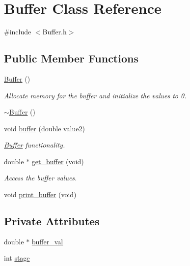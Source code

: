 \hypertarget{class_buffer}{}\section{Buffer Class Reference}
\label{class_buffer}


{\ttfamily \#include $<$Buffer.\+h$>$}

\subsection*{Public Member Functions}
\begin{DoxyCompactItemize}
\item 
\mbox{\hyperlink{class_buffer_ae7ef2cd201190fde551dcb902627112b}{Buffer}} ()
\begin{DoxyCompactList}\small\item\em Allocate memory for the buffer and initialize the values to 0. \end{DoxyCompactList}\item 
\mbox{\hyperlink{class_buffer_a59b8743e4a5f731bdd0c4185c9ef263b}{$\sim$\+Buffer}} ()
\item 
void \mbox{\hyperlink{class_buffer_a43bc2e8725cb4f43bbf4b67d2c787fd1}{buffer}} (double value2)
\begin{DoxyCompactList}\small\item\em \mbox{\hyperlink{class_buffer}{Buffer}} functionality. \end{DoxyCompactList}\item 
double $\ast$ \mbox{\hyperlink{class_buffer_a58556f015b2a2260b95a6c7005e41d45}{get\+\_\+buffer}} (void)
\begin{DoxyCompactList}\small\item\em Access the buffer values. \end{DoxyCompactList}\item 
void \mbox{\hyperlink{class_buffer_a4cc559004546a17c01c5c9f898ef993c}{print\+\_\+buffer}} (void)
\end{DoxyCompactItemize}
\subsection*{Private Attributes}
\begin{DoxyCompactItemize}
\item 
double $\ast$ \mbox{\hyperlink{class_buffer_a48f2242483497ad653ee41509b361c9f}{buffer\+\_\+val}}
\item 
int \mbox{\hyperlink{class_buffer_a18d933c855fdd62178d991d258206b80}{stage}}
\end{DoxyCompactItemize}


